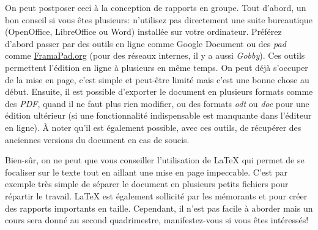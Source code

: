 \documentclass[10pt]{../fiche}
\begin{document}
On peut postposer ceci à la conception de rapports en groupe. Tout d'abord, un bon conseil si vous êtes plusieurs: n'utilisez pas directement une suite bureautique (OpenOffice, LibreOffice ou Word) installée sur votre ordinateur. Préférez d'abord passer par des outils en ligne comme Google Document ou des \textit{pad} comme \url{FramaPad.org} (pour des réseaux internes, il y a aussi \textit{Gobby}). Ces outils permettent l'édition en ligne à plusieurs en même temps. On peut déjà s'occuper de la mise en page, c'est simple et peut-être limité mais c'est une bonne chose au début. Ensuite, il est possible d'exporter le document en plusieurs formats comme des \textit{PDF}, quand il ne faut plus rien modifier, ou des formats \textit{odt} ou \textit{doc} pour une édition ultérieur (si une fonctionnalité indispensable est manquante dans l'éditeur en ligne). À noter qu'il est également possible, avec ces outils, de récupérer des anciennes versions du document en cas de soucis.

Bien-sûr, on ne peut que vous conseiller l'utilisation de \LaTeX{} qui permet de se focaliser sur le texte tout en aillant une mise en page impeccable. C'est par exemple très simple de séparer le document en plusieurs petits fichiers pour répartir le travail. \LaTeX{} est également sollicité par les mémorants et pour créer des rapports importants en taille. Cependant, il n'est pas facile à aborder mais un cours sera donné au second quadrimestre, manifestez-vous si vous êtes intéressés!
\end{document}
